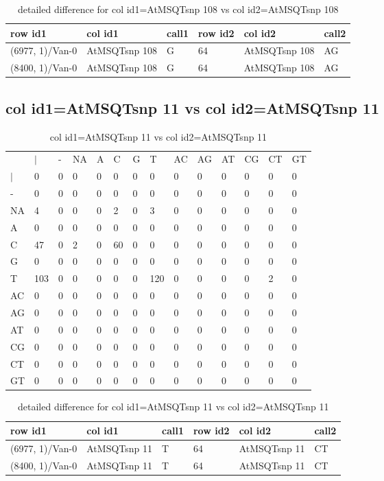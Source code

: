 \begin{center}
\begin{longtable}{|l|l|l|l|l|l|}
\caption{detailed difference for col id1=AtMSQTsnp 108 vs col id2=AtMSQTsnp 108} \label{table_dm697}\\
\hline
row id1&col id1&call1&row id2&col id2&call2\\
\hline
(6977, 1)/Van-0&AtMSQTsnp 108&G&64&AtMSQTsnp 108&AG\\
(8400, 1)/Van-0&AtMSQTsnp 108&G&64&AtMSQTsnp 108&AG\\
\hline
\end{longtable}
\end{center}

\subsection{col id1=AtMSQTsnp 11 vs col id2=AtMSQTsnp 11}
\begin{center}
\begin{longtable}{|l|l|l|l|l|l|l|l|l|l|l|l|l|l|}
\caption{col id1=AtMSQTsnp 11 vs col id2=AtMSQTsnp 11} \label{table_dm698}\\
\hline
\\
\hline
&$|$&-&NA&A&C&G&T&AC&AG&AT&CG&CT&GT\\
$|$&0&0&0&0&0&0&0&0&0&0&0&0&0\\
-&0&0&0&0&0&0&0&0&0&0&0&0&0\\
NA&4&0&0&0&2&0&3&0&0&0&0&0&0\\
A&0&0&0&0&0&0&0&0&0&0&0&0&0\\
C&47&0&2&0&60&0&0&0&0&0&0&0&0\\
G&0&0&0&0&0&0&0&0&0&0&0&0&0\\
T&103&0&0&0&0&0&120&0&0&0&0&2&0\\
AC&0&0&0&0&0&0&0&0&0&0&0&0&0\\
AG&0&0&0&0&0&0&0&0&0&0&0&0&0\\
AT&0&0&0&0&0&0&0&0&0&0&0&0&0\\
CG&0&0&0&0&0&0&0&0&0&0&0&0&0\\
CT&0&0&0&0&0&0&0&0&0&0&0&0&0\\
GT&0&0&0&0&0&0&0&0&0&0&0&0&0\\
\hline
\end{longtable}
\end{center}

\begin{center}
\begin{longtable}{|l|l|l|l|l|l|}
\caption{detailed difference for col id1=AtMSQTsnp 11 vs col id2=AtMSQTsnp 11} \label{table_dm699}\\
\hline
row id1&col id1&call1&row id2&col id2&call2\\
\hline
(6977, 1)/Van-0&AtMSQTsnp 11&T&64&AtMSQTsnp 11&CT\\
(8400, 1)/Van-0&AtMSQTsnp 11&T&64&AtMSQTsnp 11&CT\\
\hline
\end{longtable}
\end{center}

